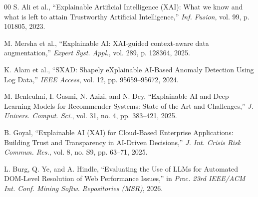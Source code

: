 \documentclass[conference]{IEEEtran}
\begin{document}
\begin{thebibliography}{00}
S. Ali et al., ``Explainable Artificial Intelligence (XAI): What we know and what is left to attain Trustworthy Artificial Intelligence,'' \textit{Inf. Fusion}, vol. 99, p. 101805, 2023.

M. Mersha et al., ``Explainable AI: XAI-guided context-aware data augmentation,'' \textit{Expert Syst. Appl.}, vol. 289, p. 128364, 2025.

K. Alam et al., ``SXAD: Shapely eXplainable AI-Based Anomaly Detection Using Log Data,'' \textit{IEEE Access}, vol. 12, pp. 95659--95672, 2024.

M. Benleulmi, I. Gasmi, N. Azizi, and N. Dey, ``Explainable AI and Deep Learning Models for Recommender Systems: State of the Art and Challenges,'' \textit{J. Univers. Comput. Sci.}, vol. 31, no. 4, pp. 383--421, 2025.

B. Goyal, ``Explainable AI (XAI) for Cloud-Based Enterprise Applications: Building Trust and Transparency in AI-Driven Decisions,'' \textit{J. Int. Crisis Risk Commun. Res.}, vol. 8, no. S9, pp. 63--71, 2025.

L. Burg, Q. Ye, and A. Hindle, ``Evaluating the Use of LLMs for Automated DOM-Level Resolution of Web Performance Issues,'' in \textit{Proc. 23rd IEEE/ACM Int. Conf. Mining Softw. Repositories (MSR)}, 2026.

\end{thebibliography}
\end{document}
